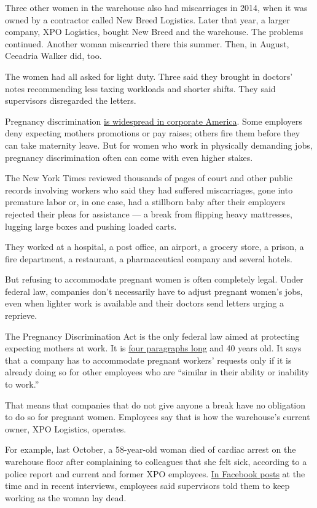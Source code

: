 Three other women in the warehouse also had miscarriages in 2014, when
it was owned by a contractor called New Breed Logistics. Later that
year, a larger company, XPO Logistics, bought New Breed and the
warehouse. The problems continued. Another woman miscarried there this
summer. Then, in August, Ceeadria Walker did, too.

The women had all asked for light duty. Three said they brought in
doctors' notes recommending less taxing workloads and shorter shifts.
They said supervisors disregarded the letters.

Pregnancy discrimination
\href{https://www.nytimes3xbfgragh.onion/interactive/2018/06/15/business/pregnancy-discrimination.html}{is
widespread in corporate America}. Some employers deny expecting mothers
promotions or pay raises; others fire them before they can take
maternity leave. But for women who work in physically demanding jobs,
pregnancy discrimination often can come with even higher stakes.

The New York Times reviewed thousands of pages of court and other public
records involving workers who said they had suffered miscarriages, gone
into premature labor or, in one case, had a stillborn baby after their
employers rejected their pleas for assistance --- a break from flipping
heavy mattresses, lugging large boxes and pushing loaded carts.

They worked at a hospital, a post office, an airport, a grocery store, a
prison, a fire department, a restaurant, a pharmaceutical company and
several hotels.

But refusing to accommodate pregnant women is often completely legal.
Under federal law, companies don't necessarily have to adjust pregnant
women's jobs, even when lighter work is available and their doctors send
letters urging a reprieve.

The Pregnancy Discrimination Act is the only federal law aimed at
protecting expecting mothers at work. It is
\href{https://www.congress.gov/bill/95th-congress/senate-bill/995}{four
paragraphs long} and 40 years old. It says that a company has to
accommodate pregnant workers' requests only if it is already doing so
for other employees who are ``similar in their ability or inability to
work.''

That means that companies that do not give anyone a break have no
obligation to do so for pregnant women. Employees say that is how the
warehouse's current owner, XPO Logistics, operates.

For example, last October, a 58-year-old woman died of cardiac arrest on
the warehouse floor after complaining to colleagues that she felt sick,
according to a police report and current and former XPO employees.
\href{https://www.facebookcorewwwi.onion/kandie.hicks.14/posts/108370139925270}{In
Facebook posts} at the time and in recent interviews, employees said
supervisors told them to keep working as the woman lay dead.

